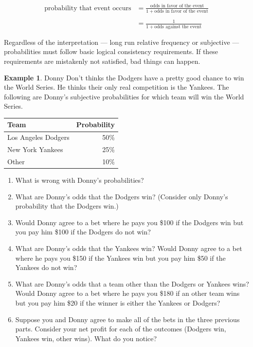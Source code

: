 \documentclass[
]{book}
\providecommand{\tightlist}{%
  \setlength{\itemsep}{0pt}\setlength{\parskip}{0pt}}
\theoremstyle{definition}
\theoremstyle{definition}
\newtheorem{example}{Example}[chapter]
\theoremstyle{definition}
\theoremstyle{remark}
\begin{document}
\begin{align*}
\text{probability that event occurs} & = \frac{\text{odds in favor of the event}}{1+\text{odds in favor of the event}}\\
& \\
& = \frac{1}{1+\text{odds against the event}}
\end{align*}

Regardless of the interpretation --- long run relative frequency or subjective --- probabilities must follow basic logical consistency requirements. If these requirements are mistakenly not satisfied, bad things can happen.

\begin{example}
\protect\hypertarget{exm:dutch}{}{\label{exm:dutch} }
Donny Don't thinks the Dodgers have a pretty good chance to win the World Series. He thinks their only real competition is the Yankees. The following are Donny's subjective probabilities for which team will win the World Series.

\begin{longtable}[]{@{}lr@{}}
\toprule
Team & Probability\tabularnewline
\midrule
\endhead
Los Angeles Dodgers & 50\%\tabularnewline
New York Yankees & 25\%\tabularnewline
Other & 10\%\tabularnewline
\bottomrule
\end{longtable}
\end{example}

\begin{enumerate}
\def\labelenumi{\arabic{enumi}.}
\tightlist
\item
  What is wrong with Donny's probabilities?
\item
  What are Donny's odds that the Dodgers win? (Consider only Donny's probability that the Dodgers win.)
\item
  Would Donny agree to a bet where he pays you \$100 if the Dodgers win but you pay him \$100 if the Dodgers do not win?
\item
  What are Donny's odds that the Yankees win? Would Donny agree to a bet where he pays you \$150 if the Yankees win but you pay him \$50 if the Yankees do not win?
\item
  What are Donny's odds that a team other than the Dodgers or Yankees wins? Would Donny agree to a bet where he pays you \$180 if an other team wins but you pay him \$20 if the winner is either the Yankees or Dodgers?
\item
  Suppose you and Donny agree to make all of the bets in the three previous parts. Consider your net profit for each of the outcomes (Dodgers win, Yankees win, other wins). What do you notice?
\end{enumerate}
\end{document}
